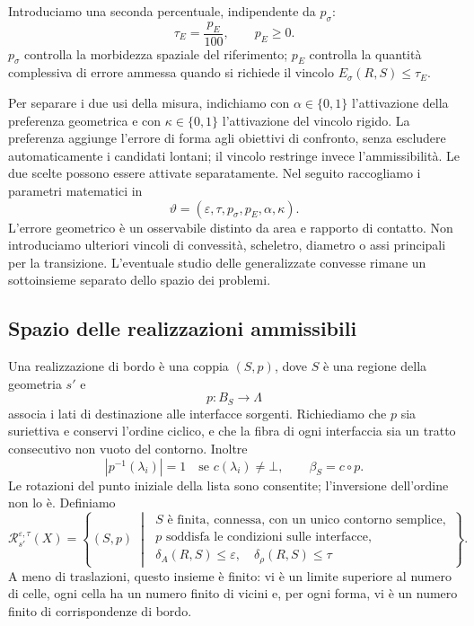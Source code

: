 \documentclass[11pt,a4paper]{article}
\newcommand{\Wild}{\bot}
\begin{document}
Introduciamo una seconda percentuale, indipendente da $p_\sigma$:
\[
\boxed{\tau_E=\frac{p_E}{100},\qquad p_E\geq0.}
\]
$p_\sigma$ controlla la morbidezza spaziale del riferimento; $p_E$ controlla la quantità complessiva di errore ammessa quando si richiede il vincolo $E_\sigma(R,S)\leq\tau_E$.

Per separare i due usi della misura, indichiamo con $\alpha\in\{0,1\}$ l'attivazione della preferenza geometrica e con $\kappa\in\{0,1\}$ l'attivazione del vincolo rigido. La preferenza aggiunge l'errore di forma agli obiettivi di confronto, senza escludere automaticamente i candidati lontani; il vincolo restringe invece l'ammissibilità. Le due scelte possono essere attivate separatamente. Nel seguito raccogliamo i parametri matematici in
\[
\vartheta=(\varepsilon,\tau,p_\sigma,p_E,\alpha,\kappa).
\]
L'errore geometrico è un osservabile distinto da area e rapporto di contatto. Non introduciamo ulteriori vincoli di convessità, scheletro, diametro o assi principali per la transizione. L'eventuale studio delle generalizzate convesse rimane un sottoinsieme separato dello spazio dei problemi.

\subsection{Spazio delle realizzazioni ammissibili}

Una realizzazione di bordo è una coppia $(S,p)$, dove $S$ è una regione della geometria $s'$ e
\[
p:B_S\longrightarrow\Lambda
\]
associa i lati di destinazione alle interfacce sorgenti. Richiediamo che $p$ sia suriettiva e conservi l'ordine ciclico, e che la fibra di ogni interfaccia sia un tratto consecutivo non vuoto del contorno. Inoltre
\[
|p^{-1}(\lambda_i)|=1\quad\text{se }c(\lambda_i)\neq\Wild,
\qquad \beta_S=c\circ p.
\]
Le rotazioni del punto iniziale della lista sono consentite; l'inversione dell'ordine non lo è. Definiamo
\[
\mathcal R_{s'}^{\varepsilon,\tau}(X)=
\left\{(S,p)\;\middle|\;
\begin{array}{l}
S\text{ è finita, connessa, con un unico contorno semplice},\\
p\text{ soddisfa le condizioni sulle interfacce},\\
\delta_A(R,S)\leq\varepsilon,\quad\delta_\rho(R,S)\leq\tau
\end{array}\right\}.
\]
A meno di traslazioni, questo insieme è finito: vi è un limite superiore al numero di celle, ogni cella ha un numero finito di vicini e, per ogni forma, vi è un numero finito di corrispondenze di bordo.
\end{document}
